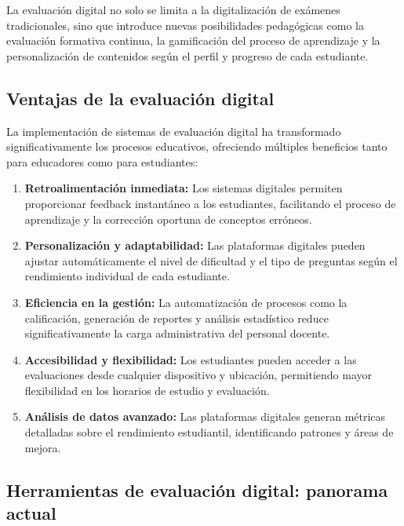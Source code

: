\documentclass[12pt,a4paper]{report}
\begin{document}
La evaluación digital no solo se limita a la digitalización de exámenes tradicionales, sino que introduce nuevas posibilidades pedagógicas como la evaluación formativa continua, la gamificación del proceso de aprendizaje y la personalización de contenidos según el perfil y progreso de cada estudiante.

\subsection{Ventajas de la evaluación digital}

La implementación de sistemas de evaluación digital ha transformado significativamente los procesos educativos, ofreciendo múltiples beneficios tanto para educadores como para estudiantes:

\begin{enumerate}
\item \textbf{Retroalimentación inmediata:} Los sistemas digitales permiten proporcionar feedback instantáneo a los estudiantes, facilitando el proceso de aprendizaje y la corrección oportuna de conceptos erróneos.

\item \textbf{Personalización y adaptabilidad:} Las plataformas digitales pueden ajustar automáticamente el nivel de dificultad y el tipo de preguntas según el rendimiento individual de cada estudiante.

\item \textbf{Eficiencia en la gestión:} La automatización de procesos como la calificación, generación de reportes y análisis estadístico reduce significativamente la carga administrativa del personal docente.

\item \textbf{Accesibilidad y flexibilidad:} Los estudiantes pueden acceder a las evaluaciones desde cualquier dispositivo y ubicación, permitiendo mayor flexibilidad en los horarios de estudio y evaluación.

\item \textbf{Análisis de datos avanzado:} Las plataformas digitales generan métricas detalladas sobre el rendimiento estudiantil, identificando patrones y áreas de mejora.
\end{enumerate}

\subsection{Herramientas de evaluación digital: panorama actual}
\end{document}
